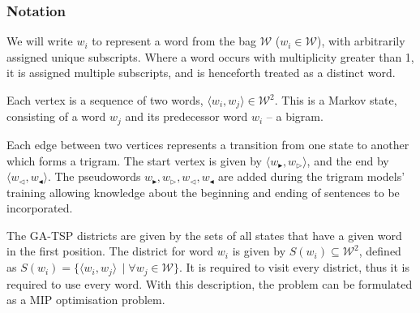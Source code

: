 \documentclass{standalone}
\begin{document}
\renewcommand{\s}{w_{\blacktriangleright}}
\renewcommand{\ss}{w_{\triangleright}}
\newcommand{\e}{w_{\triangleleft}}
\newcommand{\ee}{w_{\blacktriangleleft}}
\newcommand{\W}{\mathcal{W}}

\newcommand{\displayunskip}{\vspace{0pt}}

\subsubsection{Notation}
We will write $w_{i}$ to represent a word from the bag \textbf{$\W$} ($w_i\in \W$), with
arbitrarily assigned unique subscripts. Where a word occurs with multiplicity
greater than 1, it is assigned multiple subscripts, and is henceforth treated as a distinct word.

Each vertex is a sequence of two words, $\langle w_{i},w_{j}\rangle\in\W^{2}$.
This is a Markov state, consisting of a word $w_j$ and its predecessor word $w_i$ -- a bigram.

Each edge between two vertices represents a transition from one state to another which forms a trigram.
The start vertex is given by $\langle\s,\ss\rangle$, and the end by $\langle\e,\ee\rangle$. The pseudowords  $\s,\ss,\e,\ee$ are added during the trigram models' training allowing knowledge about the beginning and ending of sentences to be incorporated.

The GA-TSP districts are given by the sets of all states that have
a given word in the first position. The district for word $w_{i}$
is given by $S(w_{i})\subseteq\W^{2}$, defined as $S(w_{i})=\{\langle w_{i},w_{j}\rangle\,\mid \forall w_{j}\in\W\}$. It is required to visit every district, thus it is required to use every word.
With this description, the problem can be formulated as a MIP optimisation problem.
\end{document}
